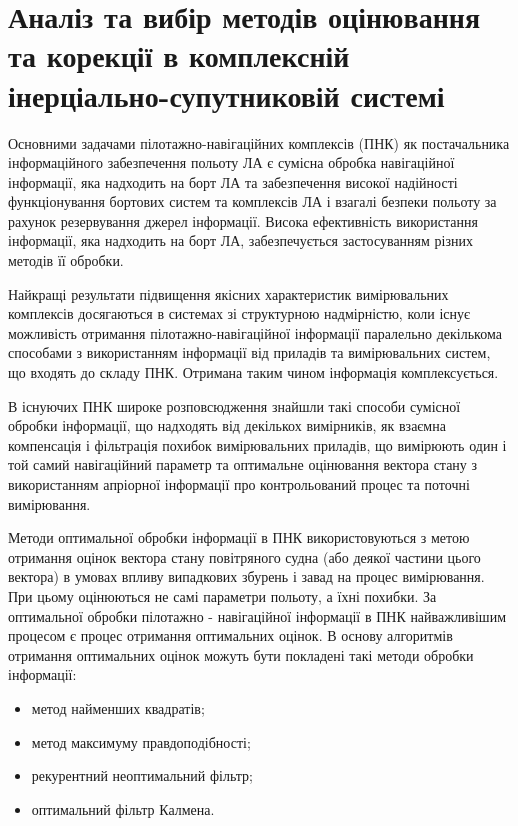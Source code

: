 \section{Аналіз та вибір методів оцінювання та корекції в комплексній інерціально-супутниковій системі}

Основними задачами пілотажно-навігаційних комплексів (ПНК) як постачальника 
інформаційного забезпечення польоту ЛА є сумісна обробка навігаційної інформації, 
яка надходить на борт ЛА та забезпечення високої надійності функціонування бортових 
систем та комплексів ЛА і взагалі безпеки польоту за рахунок резервування 
джерел інформації. Висока ефективність використання інформації, яка 
надходить на борт ЛА, забезпечується застосуванням різних методів її обробки. 

Найкращі результати підвищення якісних характеристик вимірювальних комплексів 
досягаються  в системах зі структурною надмірністю, коли існує можливість 
отримання пілотажно-навігаційної інформації паралельно декількома способами з 
використанням інформації від приладів та вимірювальних систем, що входять до 
складу ПНК. Отримана таким чином інформація комплексується.

В існуючих ПНК широке розповсюдження знайшли такі способи сумісної обробки 
інформації, що надходять від декількох вимірників, як взаємна компенсація і 
фільтрація похибок вимірювальних приладів, що вимірюють один і той самий 
навігаційний параметр та оптимальне оцінювання вектора стану з використанням 
апріорної інформації про контрольований процес та поточні вимірювання.

Методи оптимальної обробки інформації в ПНК використовуються з метою 
отримання оцінок вектора стану повітряного судна (або деякої частини 
цього вектора) в умовах впливу випадкових збурень і завад на процес 
вимірювання. При цьому оцінюються не самі параметри польоту, а їхні похибки. 
За оптимальної обробки пілотажно - навігаційної інформації в ПНК найважливішим 
процесом є процес отримання оптимальних оцінок. В основу алгоритмів отримання 
оптимальних оцінок можуть бути покладені такі методи обробки інформації:
\begin{itemize}
 \item метод найменших квадратів;
 \item метод максимуму правдоподібності;
 \item рекурентний неоптимальний фільтр;
 \item оптимальний фільтр Калмена.
\end{itemize}


